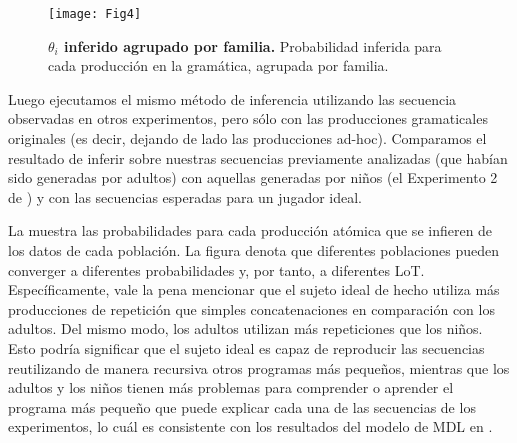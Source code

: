 \begin{figure}[!ht]
    \centering
    \texttt{[image: Fig4]}
    \caption{{\bf $\theta_i$ inferido agrupado por familia.} Probabilidad inferida para cada producción en la gramática, agrupada por familia.}
    \label{fig:thetaGrouped}
\end{figure}


Luego ejecutamos el mismo método de inferencia utilizando las secuencia observadas en otros experimentos, pero sólo con las producciones gramaticales originales (es decir, dejando de lado las producciones ad-hoc). Comparamos el resultado de inferir sobre nuestras secuencias previamente analizadas (que habían sido generadas por adultos) con aquellas generadas por niños (el Experimento 2 de   \cite{marie2016}) y con las secuencias esperadas para un jugador ideal.


La  muestra las probabilidades para cada producción atómica que se infieren de los datos de cada población. La figura denota que diferentes poblaciones pueden converger a diferentes probabilidades y, por tanto, a diferentes LoT. Específicamente, vale la pena mencionar que el sujeto ideal de hecho utiliza más producciones de repetición que simples concatenaciones en comparación con los adultos. Del mismo modo, los adultos utilizan más repeticiones que los niños. Esto podría significar que el sujeto ideal es capaz de reproducir las secuencias reutilizando de manera recursiva otros programas más pequeños, mientras que los adultos y los niños tienen más problemas para comprender o aprender el programa más pequeño que puede explicar cada una de las secuencias de los experimentos, lo cuál es consistente con los resultados del modelo de MDL en \cite{marie2016}.


